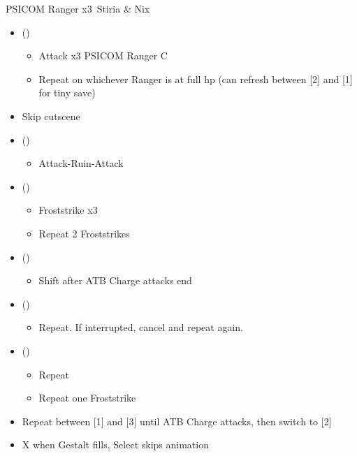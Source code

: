 
\renewcommand{\first}{[1] \com (\com)}
\renewcommand{\second}{[2] \sen (\sen)}
\renewcommand{\third}{[3] \rav (\rav)}

\begin{battle}[0:55]{PSICOM Ranger x3\, Stiria \& Nix}
	\begin{itemize}
		\item \first
		      \begin{itemize}
			      \item Attack x3 PSICOM Ranger C
			      \item Repeat on whichever Ranger is at full hp (can refresh between [2] and [1] for tiny save)
		      \end{itemize}
		\item Skip cutscene
		\item \first
		      \begin{itemize}
			      \item Attack-Ruin-Attack
		      \end{itemize}
		\item \third
		      \begin{itemize}
			      \item Froststrike x3
			      \item Repeat 2 Froststrikes
		      \end{itemize}
		\item \second
		      \begin{itemize}
			      \item Shift after ATB Charge attacks end
		      \end{itemize}
		\item \first
		      \begin{itemize}
			      \item Repeat. If interrupted, cancel and repeat again.
		      \end{itemize}
		\item \third
		      \begin{itemize}
			      \item Repeat
			      \item Repeat one Froststrike
		      \end{itemize}
		\item Repeat between [1] and [3] until ATB Charge attacks, then switch to [2]
		\item X when Gestalt fills, Select skips animation
	\end{itemize}
	 
\end{battle}

